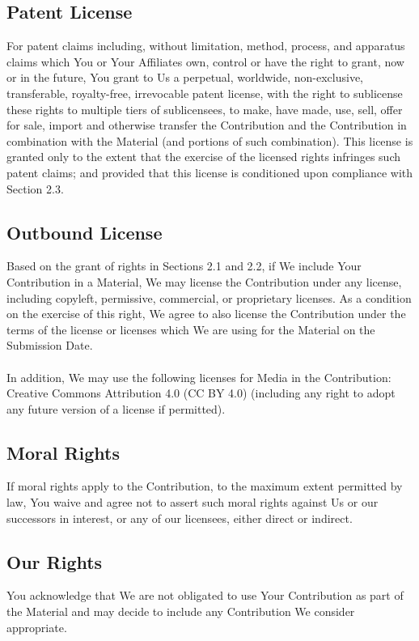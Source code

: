 \documentclass{article}
\begin{document}
\subsection{Patent License}
For patent claims including, without limitation, method, process, and apparatus
claims which You or Your Affiliates own, control or have the right to grant, now
or in the future, You grant to Us a perpetual, worldwide, non-exclusive,
transferable, royalty-free, irrevocable patent license, with the right to
sublicense these rights to multiple tiers of sublicensees, to make, have made,
use, sell, offer for sale, import and otherwise transfer the Contribution and
the Contribution in combination with the Material (and portions of such
combination). This license is granted only to the extent that the exercise of
the licensed rights infringes such patent claims; and provided that this license
is conditioned upon compliance with Section 2.3.

\subsection{Outbound License}
Based on the grant of rights in Sections 2.1 and 2.2, if We include Your
Contribution in a Material, We may license the Contribution under any license,
including copyleft, permissive, commercial, or proprietary licenses. As a
condition on the exercise of this right, We agree to also license the
Contribution under the terms of the license or licenses which We are using for
the Material on the Submission Date.
\\
\\
In addition, We may use the following licenses for Media in the Contribution:
Creative Commons Attribution 4.0 (CC BY 4.0) (including any right to adopt any
future version of a license if permitted).

\subsection{Moral Rights}
If moral rights apply to the Contribution, to the maximum extent permitted by
law, You waive and agree not to assert such moral rights against Us or our
successors in interest, or any of our licensees, either direct or indirect.

\subsection{Our Rights}
You acknowledge that We are not obligated to use Your Contribution as part of
the Material and may decide to include any Contribution We consider appropriate.
\end{document}
